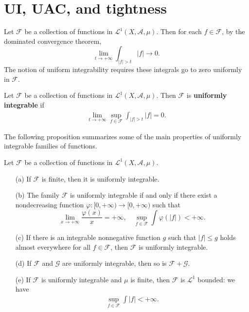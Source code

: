 \section{UI, UAC, and tightness}
Let $\mathscr{F}$ be a collection of functions in $\mathcal{L}^1(X,\mathcal{A},\mu)$. Then for each $f\in\mathscr{F}$, by the dominated convergence theorem,
\[\lim_{t\to+\infty}\int_{|f|>t}|f|\to 0.\]
The notion of uniform integrability requires these integrals go to zero uniformly in $\mathscr{F}$.
\begin{definition}
Let $\mathscr{F}$ be a collection of functions in $\mathcal{L}^1(X,\mathcal{A},\mu)$. Then $\mathscr{F}$ is \textbf{uniformly integrable} if 
\begin{align}\label{uniformly integrable def}
\lim_{t\to+\infty}\sup_{f\in\mathscr{F}}\int_{|f|>t}|f|=0.
\end{align}
\end{definition}
The following proposition summarizes some of the main properties of uniformly integrable families of functions.
\begin{proposition}\label{uniformly integrable prop}
Let $\mathscr{F}$ be a collection of functions in $\mathcal{L}^1(X,\mathcal{A},\mu)$.
\begin{itemize}
\item[(a)] If $\mathscr{F}$ is finite, then it is uniformly integrable.
\item[(b)] The family $\mathscr{F}$ is uniformly integrable if and only if there exist a nondecreasing function $\varphi:[0,+\infty)\to[0,+\infty)$ such that 
\[\lim_{x\to+\infty}\frac{\varphi(x)}{x}=+\infty,\quad \sup_{f\in\mathscr{F}}\int\varphi(|f|)<+\infty.\]
\item[(c)] If there is an integrable nonnegative function $g$ such that $|f|\leq g$ holds almost everywhere for all $f\in\mathscr{F}$, then $\mathscr{F}$ is uniformly integrable.
\item[(d)] If $\mathscr{F}$ and $\mathscr{G}$ are uniformly integrable, then so is $\mathscr{F}+\mathscr{G}$.
\item[(e)] If $\mathscr{F}$ is uniformly integrable and $\mu$ is finite, then $\mathscr{F}$ is $\mathcal{L}^1$ bounded: we have
\begin{align}\label{uniformly integrable on finite measure}
\sup_{f\in\mathscr{F}}\int|f|<+\infty.
\end{align}
\end{itemize}
\end{proposition}
